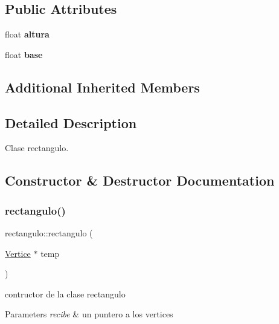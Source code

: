 \subsection*{Public Attributes}
\begin{DoxyCompactItemize}
\item 
\mbox{\label{classrectangulo_a4793bfe1636488ed8344a82a271dcd8d}} 
float {\bfseries altura}
\item 
\mbox{\label{classrectangulo_a0f5bab44f86d9b58bd1c4710f3e001b5}} 
float {\bfseries base}
\end{DoxyCompactItemize}
\subsection*{Additional Inherited Members}


\subsection{Detailed Description}
Clase rectangulo. 

\subsection{Constructor \& Destructor Documentation}
\mbox{\label{classrectangulo_aa785cc2d5bd4cbae7dab1912afba62a7}} 
\subsubsection{\texorpdfstring{rectangulo()}{rectangulo()}\hspace{0.1cm}{\footnotesize\ttfamily [1/2]}}
{\footnotesize\ttfamily rectangulo\+::rectangulo (\begin{DoxyParamCaption}\item[{\hyperlink{class_vertice}{Vertice} $\ast$}]{temp }\end{DoxyParamCaption})}



contructor de la clase rectangulo 


\begin{DoxyParams}{Parameters}
{\em recibe} & un puntero a los vertices \\
\hline
\end{DoxyParams}
\mbox{\label{classrectangulo_a430bc3e43d0d3959dc0fa6920a57c700}} 
